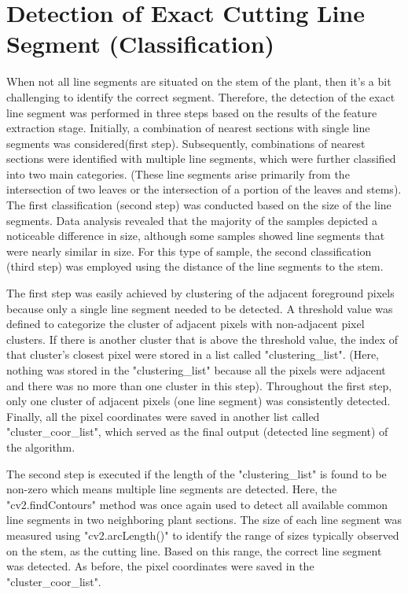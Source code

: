 \documentclass[]{iat}
\begin{document}
\section{Detection of Exact Cutting Line Segment (Classification)}

When not all line segments are situated on the stem of the plant, then it's a bit challenging to identify the correct segment. Therefore, the detection of the exact line segment was performed in three steps based on the results of the feature extraction stage. Initially, a combination of nearest sections with single line segments was considered(first step). Subsequently, combinations of nearest sections were identified with multiple line segments, which were further classified into two main categories. (These line segments arise primarily from the intersection of two leaves or the intersection of a portion of the leaves and stems). The first classification (second step) was conducted based on the size of the line segments. Data analysis revealed that the majority of the samples depicted a noticeable difference in size, although some samples showed line segments that were nearly similar in size. For this type of sample, the second classification (third step) was employed using the distance of the line segments to the stem.
\par
The first step was easily achieved by clustering of the adjacent foreground pixels because only a single line segment needed to be detected. A threshold value was defined to categorize the cluster of adjacent pixels with non-adjacent pixel clusters. If there is another cluster that is above the threshold value, the index of that cluster's closest pixel were stored in a list called "clustering\_list". (Here, nothing was stored in the "clustering\_list" because all the pixels were adjacent and there was no more than one cluster in this step).  Throughout the first step, only one cluster of adjacent pixels (one line segment) was consistently detected. Finally, all the pixel coordinates were saved in another list called "cluster\_coor\_list", which served as the final output (detected line segment) of the algorithm.
\par
The second step is executed if the length of the "clustering\_list" is found to be non-zero which means multiple line segments are detected. Here, the "cv2.findContours" method was once again used to detect all available common line segments in two neighboring plant sections. The size of each line segment was measured using "cv2.arcLength()" to identify the range of sizes typically observed on the stem, as the cutting line. Based on this range, the correct line segment was detected. As before, the pixel coordinates were saved in the "cluster\_coor\_list".
\end{document}
